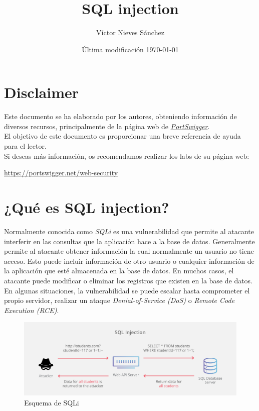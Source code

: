\documentclass[bibliography=totocnumbered]{scrartcl}
\title{SQL injection}
\author{Víctor Nieves Sánchez}
\date{Última modificación \today{}}
\newcommand{\changeurlcolor}[1]{\hypersetup{urlcolor=#1}}
\begin{document}
\maketitle
\section*{Disclaimer}
Este documento se ha elaborado por los autores, obteniendo información de diversos recursos, principalmente de la página web de \changeurlcolor{blue}\href{https://portswigger.net/web-security}{\textit{PortSwigger}}.\\
\changeurlcolor{black}
El objetivo de este documento es proporcionar una breve referencia de ayuda para el lector.\\

Si deseas más información, os recomendamos realizar los labs de su página web:
\begin{center}
\changeurlcolor{blue}\href{https://portswigger.net/web-security}{https://portswigger.net/web-security}    
\end{center}

\newpage
\tableofcontents

\newpage
\listoffigures

\newpage

\section{¿Qué es SQL injection?}
Normalmente conocida como \textit{SQLi} es una vulnerabilidad que permite al atacante interferir en las consultas que la aplicación hace a la base de datos. Generalmente permite al atacante obtener información la cual normalmente un usuario no tiene acceso. Esto puede incluir información de otro usuario o cualquier información de la aplicación que esté almacenada en la base de datos. En muchos casos, el atacante puede modificar o eliminar los registros que existen en la base de datos.\\

En algunas situaciones, la vulnerabilidad se puede escalar hasta comprometer el propio servidor, realizar un ataque \textit{Denial-of-Service (DoS)}\parencite{ddos} o \textit{Remote Code Execution (RCE)}\parencite{rce}.
\begin{figure}[h]
  \includegraphics[width=\linewidth]{figures/SQLi.png}
  \caption{Esquema de SQLi}
  \label{fig:SQLi1}
\end{figure}
\end{document}

